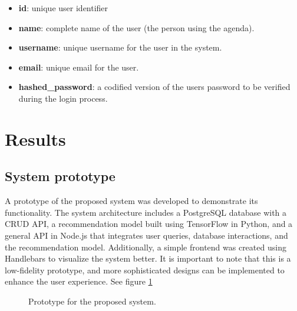 \documentclass[10pt,twocolumn,letterpaper]{article}
\begin{document}
\begin{itemize}

    \item \textbf{id}: unique user identifier

    \item \textbf{name}: complete name of the user (the person using the agenda).

    \item \textbf{username}: unique username for the user in the system.

    \item \textbf{email}: unique email for the user.

    \item \textbf{hashed\_password}: a codified version of the users password to be verified during the login process.
    
\end{itemize}










\section{Results}
\subsection{System prototype}

A prototype of the proposed system was developed to demonstrate its functionality. The system architecture includes a PostgreSQL database with a CRUD API, a recommendation model built using TensorFlow in Python, and a general API in Node.js that integrates user queries, database interactions, and the recommendation model.  Additionally, a simple frontend was created using Handlebars to visualize the system better. It is important to note that this is a low-fidelity prototype, and more sophisticated designs can be implemented to enhance the user experience. See figure \ref{fig:prototype}

\begin{figure}
       \caption{Prototype for the proposed system.}
       \label{fig:prototype}
\end{figure}
\end{document}
